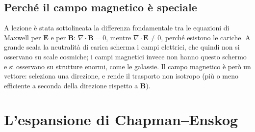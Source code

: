 \subsection{Perché il campo magnetico è speciale}
A lezione è stata sottolineata la differenza fondamentale tra le equazioni di Maxwell per $\mathbf{E}$ e per $\mathbf{B}$: $\nabla\cdot\mathbf{B}=0$, mentre $\nabla\cdot\mathbf{E}\neq0$, perché esistono le cariche. A grande scala la neutralità di carica scherma i campi elettrici, che quindi non si osservano su scale cosmiche; i campi magnetici invece non hanno questo schermo e si osservano su strutture enormi, come le galassie. Il campo magnetico è però un vettore: seleziona una direzione, e rende il trasporto non isotropo (più o meno efficiente a seconda della direzione rispetto a $\mathbf{B}$).

\section{L'espansione di Chapman--Enskog}
